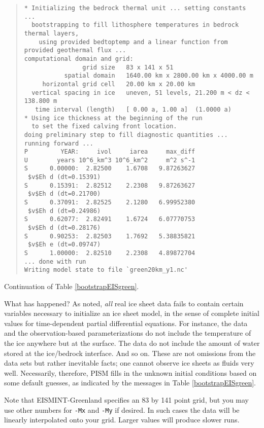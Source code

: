 \begin{table}
\centering
\scriptsize
\begin{quote}
\begin{verbatim}
* Initializing the bedrock thermal unit ... setting constants ...
  bootstrapping to fill lithosphere temperatures in bedrock thermal layers,
    using provided bedtoptemp and a linear function from provided geothermal flux ...
computational domain and grid:
                grid size   83 x 141 x 51
           spatial domain   1640.00 km x 2800.00 km x 4000.00 m
     horizontal grid cell   20.00 km x 20.00 km
  vertical spacing in ice   uneven, 51 levels, 21.200 m < dz < 138.800 m
   time interval (length)   [ 0.00 a, 1.00 a]  (1.0000 a)
* Using ice thickness at the beginning of the run
  to set the fixed calving front location.
doing preliminary step to fill diagnostic quantities ...
running forward ...
P         YEAR:     ivol     iarea     max_diff
U        years 10^6_km^3 10^6_km^2     m^2 s^-1
S      0.00000:  2.82500    1.6708   9.87263627
 $v$Eh d (dt=0.15391)
S      0.15391:  2.82512    2.2308   9.87263627
 $v$Eh d (dt=0.21700)
S      0.37091:  2.82525    2.1280   6.99952380
 $v$Eh d (dt=0.24986)
S      0.62077:  2.82491    1.6724   6.07770753
 $v$Eh d (dt=0.28176)
S      0.90253:  2.82503    1.7692   5.38835821
 $v$Eh e (dt=0.09747)
S      1.00000:  2.82510    2.2308   4.89872704
... done with run
Writing model state to file `green20km_y1.nc'
\end{verbatim}
\end{quote}
\normalsize
\bigskip

\caption{Continuation of Table \ref{bootstrapEISgreen}.}
\label{bootCONTINUED}
\end{table}

What has happened?  As noted, \emph{all} real ice sheet data fails to contain certain variables necessary to initialize an ice sheet model, in the sense of complete initial values for time-dependent partial differential equations.  For instance, the data and the observation-based parameterizations do not include the temperature of the ice anywhere but at the surface.  The data do not include the amount of water stored at the ice/bedrock interface.  And so on.  These are not omissions from the data sets but rather inevitable facts; one cannot observe ice sheets as fluids very well.  Necessarily, therefore, PISM fills in the unknown initial conditions based on some default guesses, as indicated by the messages in Table \ref{bootstrapEISgreen}.

Note that EISMINT-Greenland specifies an 83 by 141 point grid, but you may use other numbers for \texttt{-Mx} and \texttt{-My} if desired.  In such cases the data will be linearly interpolated onto your grid.  Larger values will produce slower runs.

